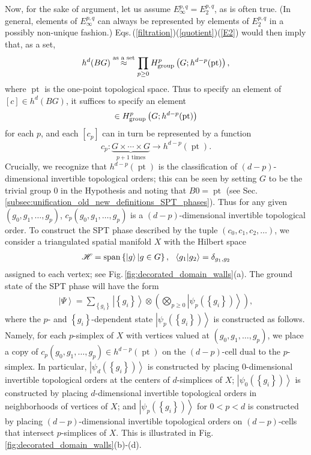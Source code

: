 \documentclass[sort&compress]{elsarticle}
\theoremstyle{theoremstyle}
\theoremstyle{framedtheoremstyle}
\theoremstyle{definitionstyle}
\theoremstyle{definitionstyle}
\theoremstyle{definitionstyle}
\theoremstyle{definitionstyle}
\theoremstyle{nameddefinitionstyle}
\theoremstyle{framednameddefinitionstyle}
\theoremstyle{proofstyle}
\theoremstyle{definitionstyle}
\newcommand{\fromto}{\rightarrow}
\newcommand{\homeomorphic}{\approx}
\newcommand{\paren}[1]{\left( #1 \right)}
\newcommand{\braces}[1]{\left\{ #1 \right\}}
\newcommand{\ket}[1]{\left|#1\right\rangle}
\newcommand{\braket}[2]{\left\langle#1\middle|#2\right\rangle}
\DeclareMathOperator{\pt}{pt}
\begin{document}
Now, for the sake of argument, let us assume $E_\infty^{p,q} = E_2^{p,q}$, as is often true. (In general, elements of $E_\infty^{p,q}$ can always be represented by elements of $E_2^{p,q}$ in a possibly non-unique fashion.) Eqs.\,(\ref{filtration})(\ref{quotient})(\ref{E2}) would then imply that, as a set,
\begin{equation}
h^d(BG) \overset{\text{as~a~set}}{\homeomorphic} \prod_{p \geq 0} H^p_{\rm group}\paren{G; h^{d-p}(\pt)},
\end{equation}
where $\pt$ is the one-point topological space. Thus to specify an element of $[c] \in h^d(BG)$, it suffices to specify an element
\begin{equation}
[c_p] \in H^p_{\rm group}\paren{G; h^{d-p}(\pt)}
\end{equation}
for each $p$, and each $[c_p]$ can in turn be represented by a function
\begin{equation}
c_p: \underbrace{G \times \cdots \times G}_{p+1\text{~times}} \fromto  h^{d-p}(\pt).
\end{equation}
Crucially, we recognize that $h^{d-p}(\pt)$ is the classification of $(d-p)$-dimensional invertible topological orders; this can be seen by setting $G$ to be the trivial group $0$ in the Hypothesis and noting that $B0 = \pt$ (see Sec.\,\ref{subsec:unification_old_new_definitions_SPT_phases}). Thus for any given $(g_0, g_1, \ldots, g_p)$, $c_p(g_0, g_1, \ldots, g_p)$ is a $(d-p)$-dimensional invertible topological order.
To construct the SPT phase described by the tuple $\paren{c_0, c_1, c_2, \ldots}$, we consider a triangulated spatial manifold $X$ with the Hilbert space
\begin{eqnarray}
\mathscr H = {\rm span} \braces{ \ket{g} | g\in G }, ~~ \braket{g_1}{g_2} = \delta_{g_1, g_2} \label{CG}
\end{eqnarray}
assigned to each vertex; see Fig.\,\ref{fig:decorated_domain_walls}(a). The ground state of the SPT phase will have the form
\begin{eqnarray}
\ket{\Psi} = \sum_{\braces{g_i}} \ket{\braces{g_i}} \otimes \paren{ \bigotimes_{p\geq 0} \ket{\psi_p\paren{\braces{g_i}}} } , \label{ground_state_DDW}
\end{eqnarray}
where the $p$- and $\braces{g_i}$-dependent state $\ket{\psi_p\paren{\braces{g_i}}}$ is constructed as follows. Namely, for each $p$-simplex of $X$ with vertices valued at $(g_0, g_1, \ldots, g_p)$, we place a copy of $c_p(g_0, g_1, \ldots, g_p) \in h^{d-p}(\pt)$ on the $(d-p)$-cell dual to the $p$-simplex. In particular, $\ket{\psi_d\paren{\braces{g_i}}}$ is constructed by placing $0$-dimensional invertible topological orders at the centers of $d$-simplices of $X$; $\ket{\psi_0\paren{\braces{g_i}}}$ is constructed by placing $d$-dimensional invertible topological orders in neighborhoods of vertices of $X$; and $\ket{\psi_p\paren{\braces{g_i}}}$ for $0 < p < d$ is constructed by placing $(d-p)$-dimensional invertible topological orders on $(d-p)$-cells that intersect $p$-simplices of $X$. This is illustrated in Fig.\,\ref{fig:decorated_domain_walls}(b)-(d).
\end{document}
